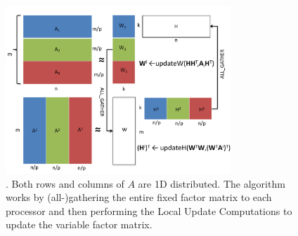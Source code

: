 \begin{figure}[t!]
\centering
\includegraphics[height=2.5in, width=\columnwidth]{fig/anlsbpp.pdf}
\caption{\NaiveAlg. Both rows and columns of $A$ are 1D distributed.  The algorithm works by (all-)gathering the entire fixed factor matrix to each processor and then performing the Local Update Computations to update the variable factor matrix.} 
\label{fig:naive}
\end{figure}

